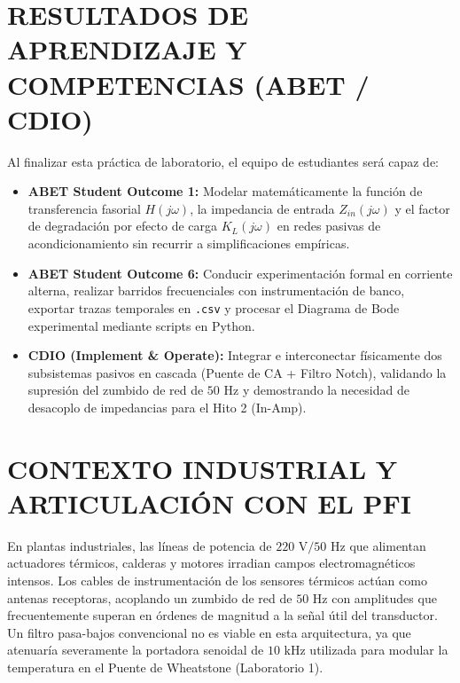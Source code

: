 \documentclass[11pt,a4paper,twoside]{article}
\begin{document}
\section{RESULTADOS DE APRENDIZAJE Y COMPETENCIAS (ABET / CDIO)}
Al finalizar esta práctica de laboratorio, el equipo de estudiantes será capaz de:
\begin{itemize}[itemsep=2pt]
    \item \textbf{ABET Student Outcome 1:} Modelar matemáticamente la función de transferencia fasorial $H(j\omega)$, la impedancia de entrada $Z_{in}(j\omega)$ y el factor de degradación por efecto de carga $K_L(j\omega)$ en redes pasivas de acondicionamiento sin recurrir a simplificaciones empíricas.
    \item \textbf{ABET Student Outcome 6:} Conducir experimentación formal en corriente alterna, realizar barridos frecuenciales con instrumentación de banco, exportar trazas temporales en \texttt{.csv} y procesar el Diagrama de Bode experimental mediante scripts en Python.
    \item \textbf{CDIO (Implement \& Operate):} Integrar e interconectar físicamente dos subsistemas pasivos en cascada (Puente de CA + Filtro Notch), validando la supresión del zumbido de red de $50\text{ Hz}$ y demostrando la necesidad de desacoplo de impedancias para el Hito 2 (In-Amp).
\end{itemize}

\section{CONTEXTO INDUSTRIAL Y ARTICULACIÓN CON EL PFI}
En plantas industriales, las líneas de potencia de $220\text{ V} / 50\text{ Hz}$ que alimentan actuadores térmicos, calderas y motores irradian campos electromagnéticos intensos. Los cables de instrumentación de los sensores térmicos actúan como antenas receptoras, acoplando un zumbido de red de $50\text{ Hz}$ con amplitudes que frecuentemente superan en órdenes de magnitud a la señal útil del transductor. Un filtro pasa-bajos convencional no es viable en esta arquitectura, ya que atenuaría severamente la portadora senoidal de $10\text{ kHz}$ utilizada para modular la temperatura en el Puente de Wheatstone (Laboratorio 1).
\end{document}
